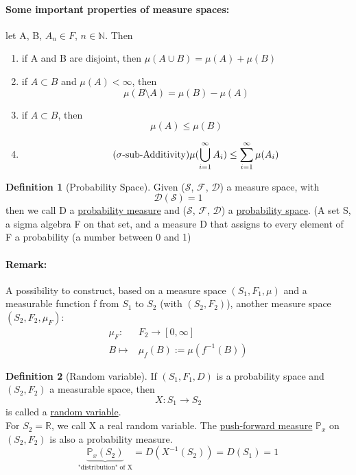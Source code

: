 \documentclass[10pt,a4paper]{article}
\theoremstyle{definition}
\newtheorem{definition}{Definition}[part]
\theoremstyle{plain}
\begin{document}
\paragraph{Some important properties of measure spaces:} let A, B, $A_n \in F$, $n \in \mathbb{N}$. Then
\begin{enumerate}
	\item if A and B are disjoint, then $\mu(A \cup B) = \mu(A) + \mu(B)$
	\item if $A \subset B$ and $\mu(A) < \infty$, then
	$$ \mu(B\setminus A) = \mu(B)-\mu(A)$$
	\item if $A \subset B$, then
	 $$\mu(A) \leq \mu(B)$$
	\item \begin{equation}
		\tag{$\sigma\text{-sub-Additivity}$}
		\mu (\bigcup_{i = 1}^{\infty} A_i) \leq \sum_{i = 1}^{\infty} \mu(A_i)
	\end{equation}
\end{enumerate}

\begin{definition}[Probability Space]
	Given ($\mathcal{S}$, $\mathcal{F}$, $\mathcal{D}$) a measure space, with 
	$$\mathcal{D}(\mathcal{S}) = 1$$
	then we call D a \underline{probability measure} and ($\mathcal{S}$, $\mathcal{F}$, $\mathcal{D}$) a \underline{probability space}.
	(A set S, a sigma algebra F on that set, and a measure D that assigns to every element of F a probability (a number between 0 and 1)
\end{definition}
\paragraph{Remark:} A possibility to construct, based on a measure space $(S_1, F_1, \mu)$ and a measurable function f from $S_1$ to $S_2$ (with $(S_2, F_2)$), another measure space $(S_2, F_2, \mu_F)$:
\begin{eqnarray*}
	\mu_F: & F_2 \rightarrow [0, \infty] \\
	 B\mapsto & \mu_f(B) := \mu(f^{-1} (B))
\end{eqnarray*}  
\begin{definition}[Random variable]
	If $(S_1, F_1, D)$ is a probability space and $(S_2, F_2)$ a measurable space, then
	$$X: S_1 \rightarrow S_2$$
	is called a \underline{random variable}. \\
	For $S_2 = \mathbb{R}$, we call X a real random variable. The \underline{push-forward measure} $\mathbb{P}_x$ on $(S_2, F_2)$ is also a probability measure.
	$$\underbrace{\mathbb{P}_x(S_2)}_{\text{"distribution" of X}} = D(X^{-1}(S_2)) = D(S_1) = 1$$
\end{definition}
\end{document}
